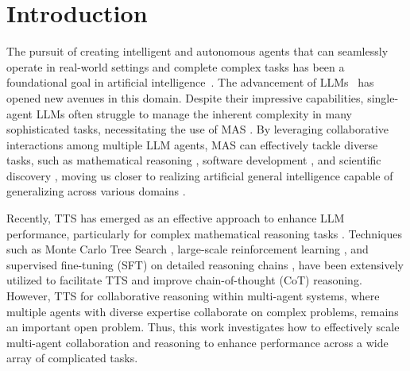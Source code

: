 \section{Introduction}
The pursuit of creating intelligent and autonomous agents that can seamlessly operate in real-world settings and complete complex tasks has been a foundational goal in artificial intelligence~\citep{wooldridge1995intelligent,Minsky88,bubeck2023sparks}. The advancement of LLMs~\citep{gpt4,gpt4o,deepseek_v3,qwen2,songoptimization,sun2025maskpro,shi-etal-2025-personax} has opened new avenues in this domain. Despite their impressive capabilities, single-agent LLMs often struggle to manage the inherent complexity in many sophisticated tasks, necessitating the use of MAS \citep{feng2025one,camel}. By leveraging collaborative interactions among multiple LLM agents, MAS can effectively tackle diverse tasks, such as mathematical reasoning \citep{agentverse}, software development \citep{chatdev}, and scientific discovery \citep{agent_laboratory,ai_scientist}, moving us closer to realizing artificial general intelligence capable of generalizing across various domains \citep{goertzel2007artificial,clune2020aigas,jin2025rankflow,jin2025apeer,ni2024harnessing}.

Recently, TTS has emerged as an effective approach to enhance LLM performance, particularly for complex mathematical reasoning tasks \citep{r1,snell2025scaling,tts,s1,rebase,jin2024impact,wang2025larger,li2024graph,nie2024text,nie2024code,yuan2025superficial,wang2024large}. Techniques such as Monte Carlo Tree Search \citep{mcts,zhang2024o1codero1replicationcoding,llama_berry}, large-scale reinforcement learning \citep{r1,o1,o1rl}, and supervised fine-tuning (SFT) on detailed reasoning chains \citep{s1,limo}, have been extensively utilized to facilitate TTS and improve chain-of-thought (CoT) reasoning. However, TTS for collaborative reasoning within multi-agent systems, where multiple agents with diverse expertise collaborate on complex problems, remains an important open problem. Thus, this work investigates how to effectively scale multi-agent collaboration and reasoning to enhance performance across a wide array of complicated tasks.

